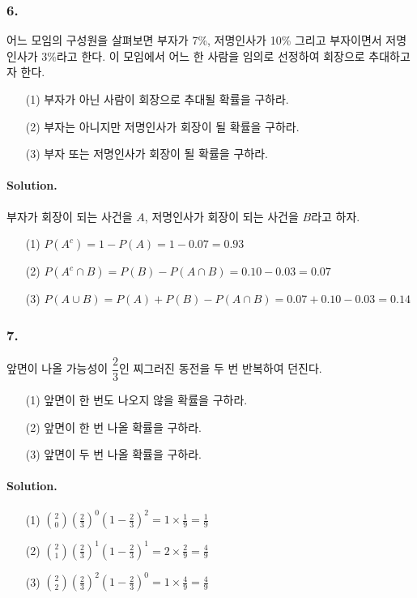 \subsubsection{6.} 어느 모임의 구성원을 살펴보면 부자가 7\%, 저명인사가 10\% 그리고 부자이면서 저명인사가 3\%라고 한다. 이 모임에서 어느 한 사람을 임의로 선정하여 회장으로 추대하고자 한다.
\begin{itemize}
	\item[(1)] 부자가 아닌 사람이 회장으로 추대될 확률을 구하라.
	\item[(2)] 부자는 아니지만 저명인사가 회장이 될 확률을 구하라.
	\item[(3)] 부자 또는 저명인사가 회장이 될 확률을 구하라.
\end{itemize}

\paragraph{Solution.} 부자가 회장이 되는 사건을 $A$, 저명인사가 회장이 되는 사건을 $B$라고 하자.
\begin{itemize}
	\item[(1)] $P\left(A^c\right) = 1 - P\left(A\right) = 1 - 0.07 = 0.93$
	\item[(2)] $P\left(A^c \cap B \right) = P\left(B\right) - P\left(A \cap B \right) = 0.10 - 0.03 = 0.07$
	\item[(3)] $P\left(A \cup B \right) = P\left(A\right) + P\left(B\right) - P\left(A \cap B \right) = 0.07 + 0.10 - 0.03 = 0.14$
\end{itemize}

\subsubsection{7.} 앞면이 나올 가능성이 $\dfrac{2}{3}$인 찌그러진 동전을 두 번 반복하여 던진다.
\begin{itemize}
	\item[(1)] 앞면이 한 번도 나오지 않을 확률을 구하라.
	\item[(2)] 앞면이 한 번 나올 확률을 구하라.
	\item[(3)] 앞면이 두 번 나올 확률을 구하라.
\end{itemize}

\paragraph{Solution.}
\begin{itemize}
	\item[(1)] $\displaystyle \binom{2}{0} \left(\frac{2}{3}\right)^0 \left(1 - \frac{2}{3}\right)^2 = 1 \times \frac{1}{9} = \frac{1}{9}$
	\item[(2)] $\displaystyle \binom{2}{1} \left(\frac{2}{3}\right)^1 \left(1 - \frac{2}{3}\right)^1 = 2 \times \frac{2}{9} = \frac{4}{9}$
	\item[(3)] $\displaystyle \binom{2}{2} \left(\frac{2}{3}\right)^2 \left(1 - \frac{2}{3}\right)^0 = 1 \times \frac{4}{9} = \frac{4}{9}$
\end{itemize}

